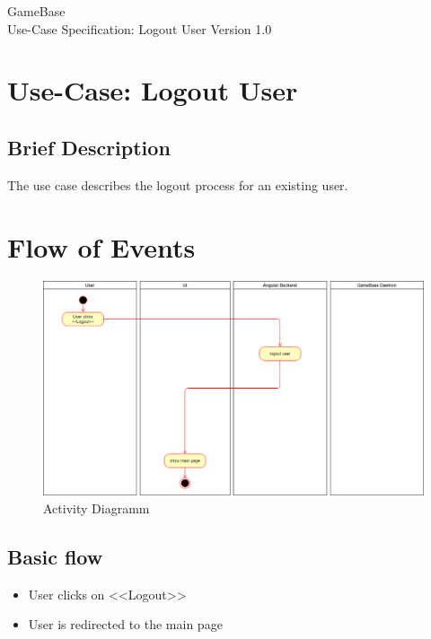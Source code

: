 \documentclass[a4paper,12pt,chapterprefix=false,bibliography=totoc,listof=totoc,book]{scrreprt}
\begin{document}
    \begin{flushright}
        GameBase
        \\
        Use-Case Specification: Logout User
        \bigbreak
        Version 1.0
    \end{flushright}

    \tableofcontents

    \chapter{Use-Case: Logout User}

    \section{Brief Description}
    The use case describes the logout process for an existing user.

    \chapter{Flow of Events}
    \begin{figure}[H]
        \includegraphics[width=\textwidth]{diagramms/UCLogoutUserDiagramm.png}
        \caption{Activity Diagramm}
        \label{fig:ucd}
    \end{figure}
    \section{Basic flow}

    \begin{itemize}
        \item User clicks on <<Logout>>
        \item User is redirected to the main page
    \end{itemize}
\end{document}
